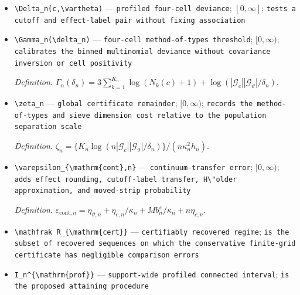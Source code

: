 \documentclass{article}
\begin{document}
\begin{itemize}
  \item \texttt{\textbackslash{}\allowbreak{}Delta\_\allowbreak{}n(c,\allowbreak{}\textbackslash{}\allowbreak{}vartheta)} --- \texttt{profiled four-\allowbreak{}cell deviance}; \([0,\infty]\); \texttt{tests a cutoff and effect-\allowbreak{}label pair without fixing association}
  \item \texttt{\textbackslash{}\allowbreak{}Gamma\_\allowbreak{}n(\textbackslash{}\allowbreak{}delta\_\allowbreak{}n)} --- \texttt{four-\allowbreak{}cell method-\allowbreak{}of-\allowbreak{}types threshold}; \([0,\infty)\); \texttt{calibrates the binned multinomial deviance without covariance inversion or cell positivity}
  \par\smallskip\noindent\emph{Definition.} \(\Gamma_n(\delta_n)=3\sum_{k=1}^{K_n}\log(N_k(c)+1)+\log(|\mathcal G_c||\mathcal G_\vartheta|/\delta_n)\).
  \item \texttt{\textbackslash{}\allowbreak{}zeta\_\allowbreak{}n} --- \texttt{global certificate remainder}; \([0,\infty)\); \texttt{records the method-\allowbreak{}of-\allowbreak{}types and sieve dimension cost relative to the population separation scale}
  \par\smallskip\noindent\emph{Definition.} \(\zeta_n=\{K_n\log(n|\mathcal G_c||\mathcal G_\vartheta|/\delta_n)\}/(n\kappa_n^2h_n)\).
  \item \texttt{\textbackslash{}\allowbreak{}varepsilon\_\allowbreak{}\{\textbackslash{}\allowbreak{}mathrm\{cont\}\allowbreak{},\allowbreak{}n\}\allowbreak{}} --- \texttt{continuum-\allowbreak{}transfer error}; \([0,\infty)\); \texttt{adds effect rounding,\allowbreak{} cutoff-\allowbreak{}label transfer,\allowbreak{} H\textbackslash{}\allowbreak{}"older approximation,\allowbreak{} and moved-\allowbreak{}strip probability}
  \par\smallskip\noindent\emph{Definition.} \(\varepsilon_{\mathrm{cont},n}=\eta_{\vartheta,n}+\eta_{c,n}/\kappa_n+M b_n^s/\kappa_n+n\eta_{c,n}\).
  \item \texttt{\textbackslash{}\allowbreak{}mathfrak R\_\allowbreak{}\{\textbackslash{}\allowbreak{}mathrm\{cert\}\allowbreak{}\}\allowbreak{}} --- \texttt{certifiably recovered regime}; \texttt{is the subset of recovered sequences on which the conservative finite-\allowbreak{}grid certificate has negligible comparison errors}
  \item \texttt{I\_\allowbreak{}n\textasciicircum{}\{\textbackslash{}\allowbreak{}mathrm\{prof\}\allowbreak{}\}\allowbreak{}} --- \texttt{support-\allowbreak{}wide profiled connected interval}; \texttt{is the proposed attaining procedure}

\end{itemize}
\end{document}
